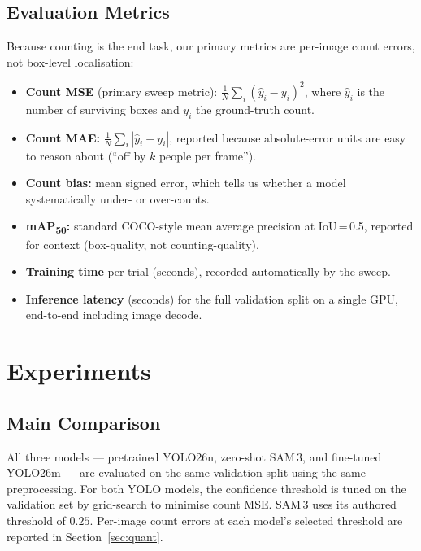 \documentclass{article}
\begin{document}
\subsection{Evaluation Metrics}
\label{sec:metrics}
Because counting is the end task, our primary metrics are
per-image count errors, not box-level localisation:
\begin{itemize}[leftmargin=1.5em]
    \item \textbf{Count MSE} (primary sweep metric):
    $\tfrac{1}{N}\sum_i (\hat{y}_i - y_i)^2$, where $\hat{y}_i$ is
    the number of surviving boxes and $y_i$ the ground-truth count.
    \item \textbf{Count MAE:}
    $\tfrac{1}{N}\sum_i |\hat{y}_i - y_i|$, reported because
    absolute-error units are easy to reason about
    (``off by $k$ people per frame'').
    \item \textbf{Count bias:} mean signed error, which tells us
    whether a model systematically under- or over-counts.
    \item \textbf{mAP\textsubscript{50}:} standard COCO-style mean
    average precision at IoU\,=\,0.5, reported for context
    (box-quality, not counting-quality).
    \item \textbf{Training time} per trial (seconds), recorded
    automatically by the sweep.
    \item \textbf{Inference latency} (seconds) for the full
    validation split on a single GPU, end-to-end including image
    decode.
\end{itemize}

\section{Experiments}
\subsection{Main Comparison}
All three models --- pretrained YOLO26n, zero-shot SAM\,3, and
fine-tuned YOLO26m --- are evaluated on the same validation split
using the same preprocessing. For both YOLO models, the
confidence threshold is tuned on the validation set by
grid-search to minimise count MSE. SAM\,3 uses its authored
threshold of $0.25$. Per-image count errors at each model's
selected threshold are reported in Section~\ref{sec:quant}.
\end{document}

